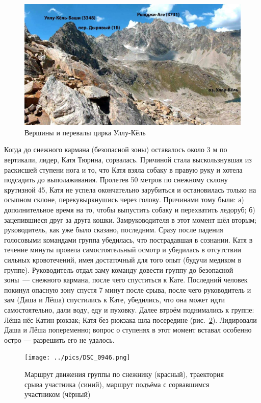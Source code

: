 \begin{figure}[h!]
	\centering
	\includegraphics[width=0.7\linewidth]{../pics/20aug4.jpg}
	\caption{Вершины и перевалы цирка Уллу-Кёль}
	\label{fig:20aug4.jpg}
\end{figure}

Когда до снежного кармана (безопасной зоны) оставалось около 3 м по вертикали, лидер, Катя Тюрина, сорвалась. Причиной стала выскользнувшая из раскисшей ступени нога и то, что Катя взяла собаку в правую руку и хотела подсадить до выполаживания. Пролетев 50 метров по снежному склону крутизной 45\degree, Катя не успела окончательно зарубиться и остановилась только на осыпном склоне, перекувыркнушись через голову. Причинами тому были: а) дополнительное время на то, чтобы выпустить собаку и перехватить ледоруб; б) зацепившиеся друг за друга кошки. Замруководителя в этот момент шёл вторым; руководитель, как уже было сказано, последним. Сразу после падения голосовыми командами группа убедилась, что пострадавшая в сознании. Катя в течение минуты провела самостоятельный осмотр и убедилась в отсутствии сильных кровотечений, имея достаточный для того опыт (будучи медиком в группе). Руководитель отдал заму команду довести группу до безопасной зоны~--- снежного кармана, после чего спуститься к Кате. Последний человек покинул опасную зону спустя 7 минут после срыва, после чего руководитель и зам (Даша и Лёша) спустились к Кате, убедились, что она может идти самостоятельно, дали воду, еду и пуховку. Далее втроём поднимались к группе: Лёша нёс Катин рюкзак; Катя без рюкзака шла посередине (рис.~\ref{fig:DSC_0946}). Лидировали Даша и Лёша попеременно; вопрос о ступенях в этот момент вставал особенно остро --- разрешить его не удалось. 


\begin{figure}[h!]
	\centering
	\texttt{[image: ../pics/DSC\_0946.png]}
	\caption{Маршрут движения группы по снежнику (красный), траектория срыва участника (синий), маршрут подъёма с сорвавшимся участником (чёрный)}
	\label{fig:DSC_0946}
\end{figure}

